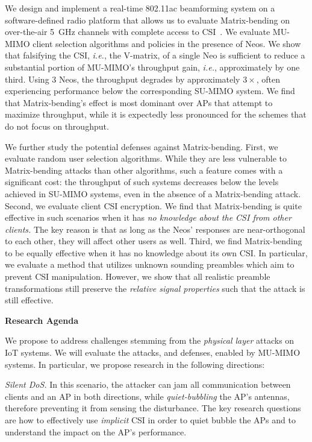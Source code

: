 We design and implement a real-time 802.11ac beamforming system on a software-defined radio 
platform that allows us to evaluate Matrix-bending on over-the-air 5~GHz channels with complete access to CSI~\cite{warpProject}. We evaluate MU-MIMO client selection 
algorithms and policies in the presence of Neos. We show that falsifying the CSI, \emph{i.e.}, the V-matrix, of a single Neo is sufficient to reduce a substantial portion of MU-MIMO's throughput gain, \emph{i.e.}, approximately by one third. Using $3$ Neos, the throughput degrades by approximately $3\times$, often experiencing performance below
the corresponding SU-MIMO system. We find that Matrix-bending's effect is most dominant over APs that attempt to maximize throughput,  while it is expectedly less pronounced for the schemes that do not focus on throughput.

We further study the potential defenses against Matrix-bending.  First, we evaluate random user selection algorithms. While they are less vulnerable to Matrix-bending attacks than other algorithms, such a feature comes with a significant cost: the throughput of such systems decreases below the levels achieved in SU-MIMO systems, even in the absence of a Matrix-bending attack. Second, we evaluate client CSI encryption. We find that Matrix-bending is quite effective in such scenarios when it has \emph{no knowledge about the CSI from other clients.} The key reason is that as long as the Neos' responses are near-orthogonal to each other, they will affect other users as well. Third, we find Matrix-bending to be equally effective when it has no knowledge about its own CSI. In particular, we evaluate a method that utilizes unknown sounding preambles which aim to prevent CSI manipulation. However, we show that all realistic preamble transformations still preserve the \emph{relative signal properties} such that the attack is still effective.

{\bf Research Agenda}

We propose to address challenges stemming from the \emph{physical layer} attacks on IoT systems. We will evaluate the attacks, and defenses, enabled by MU-MIMO systems. In particular, we propose research in the following directions:

\emph{Silent DoS.} In this scenario, the attacker can jam all communication between clients and an AP in both directions, while \emph{quiet-bubbling} the AP’s antennas, therefore preventing it from sensing the disturbance. The key research questions are how to effectively use \emph{implicit} CSI in order to quiet bubble the APs and to understand the impact on the AP’s performance.

